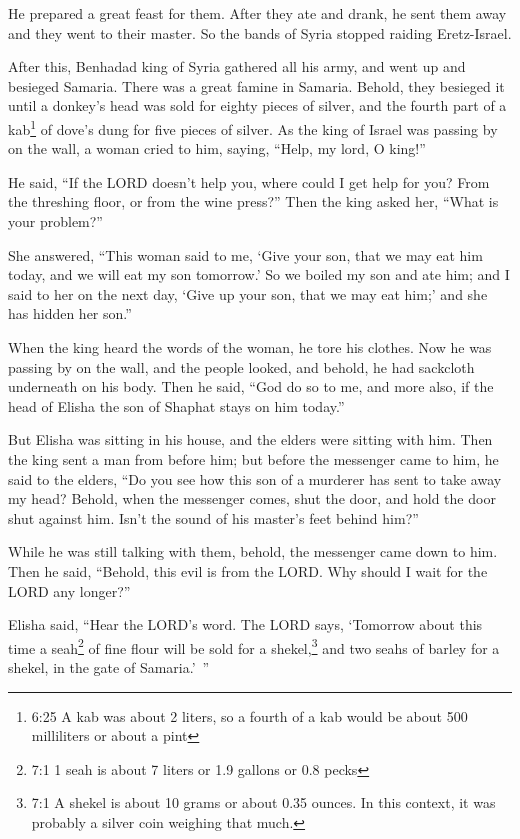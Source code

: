 \myverse{}He prepared a great feast for them. After they ate and drank,
he sent them away and they went to their master. So the bands of Syria stopped raiding Eretz-Israel.

\myverse{}After this, Benhadad king of Syria gathered all his army, and
went up and besieged Samaria.
\myverse{}There was a great famine in Samaria. Behold, they besieged it until a donkey’s
head was sold for eighty pieces of silver, and the fourth part of a kab\footnote{6:25 A kab was about 2 liters, so a fourth of a kab would be about 500 milliliters or about a pint}
of dove’s dung for five pieces of silver.
\myverse{}As the king of Israel was passing by on the wall, a woman cried to him, saying,
“Help, my lord, O king!”

\myverse{}He said, “If the LORD doesn’t help you, where could I get help
for you? From the threshing floor, or from the wine press?”
\myverse{}Then the king asked her, “What is your problem?”

She answered, “This woman said to me, ‘Give your son, that we may eat him today, and we will
eat my son tomorrow.’
\myverse{}So we boiled my son and ate him; and I said to her on the next day, ‘Give
up your son, that we may eat him;’ and she has hidden her son.”

\myverse{}When the king heard the words of the woman, he tore his clothes.
Now he was passing by on the wall, and the people looked, and behold, he had sackcloth underneath on his
body.
\myverse{}Then he said, “God do so to me, and more also, if the head of Elisha the son
of Shaphat stays on him today.”

\myverse{}But Elisha was sitting in his house, and the elders were sitting
with him. Then the king sent a man from before him; but before the messenger came to him, he said to the
elders, “Do you see how this son of a murderer has sent to take away my head? Behold, when the messenger
comes, shut the door, and hold the door shut against him. Isn’t the sound of his master’s feet behind
him?”

\myverse{}While he was still talking with them, behold, the messenger came
down to him. Then he said, “Behold, this evil is from the LORD. Why should I wait for the LORD any longer?”


\mychapter{} \myverse*{}Elisha said, “Hear the LORD’s word. The LORD says, ‘Tomorrow about
this time a seah\footnote{7:1 1 seah is about 7 liters or 1.9 gallons or 0.8 pecks} of fine flour will be sold for
a shekel,\footnote{7:1 A shekel is about 10 grams or about 0.35 ounces. In this context, it was probably a silver coin
	weighing that much.} and two seahs of barley for a shekel, in the gate of Samaria.’ ”

